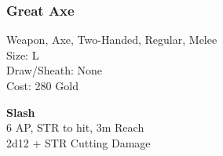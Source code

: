 \subsubsection{Great Axe}\label{weapon:greatAxe}
Weapon, Axe, Two-Handed, Regular, Melee\\
Size: L\\
Draw/Sheath: None\\
Cost: 280 Gold

\textbf{Slash}\\
6 AP, STR to hit, 3m Reach\\
2d12 + \texttimes STR Cutting Damage
